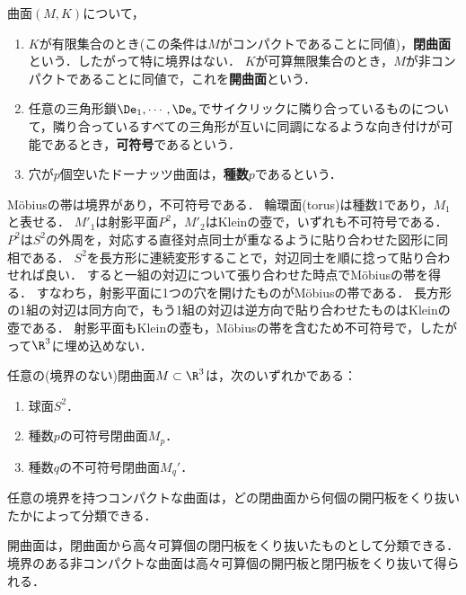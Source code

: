 \documentclass[uplatex,dvipdfmx]{jsreport}
\begin{document}
\begin{definition}[曲面の位相不変量]
    曲面$(M,K)$について，
    \begin{enumerate}
        \item $K$が有限集合のとき(この条件は$M$がコンパクトであることに同値)，\textbf{閉曲面}という．したがって特に境界はない．
        $K$が可算無限集合のとき，$M$が非コンパクトであることに同値で，これを\textbf{開曲面}という．
        \item 任意の三角形鎖$\De_1,\cdots,\De_s$でサイクリックに隣り合っているものについて，隣り合っているすべての三角形が互いに同調になるような向き付けが可能であるとき，\textbf{可符号}であるという．
        \item 穴が$p$個空いたドーナッツ曲面は，\textbf{種数$p$}であるという．
    \end{enumerate}
\end{definition}
\begin{example}[射影平面]
    Möbiusの帯は境界があり，不可符号である．
    輪環面(torus)は種数1であり，$M_1$と表せる．
    $M'_1$は射影平面$P^2$，$M'_2$はKleinの壺で，いずれも不可符号である．
    $P^2$は$S^2$の外周を，対応する直径対点同士が重なるように貼り合わせた図形に同相である．
    $S^2$を長方形に連続変形することで，対辺同士を順に捻って貼り合わせれば良い．
    すると一組の対辺について張り合わせた時点でMöbiusの帯を得る．
    すなわち，射影平面に1つの穴を開けたものがMöbiusの帯である．
    長方形の1組の対辺は同方向で，もう1組の対辺は逆方向で貼り合わせたものはKleinの壺である．
    射影平面もKleinの壺も，Möbiusの帯を含むため不可符号で，したがって$\R^3$に埋め込めない．
\end{example}

\begin{theorem}
    任意の(境界のない)閉曲面$M\subset\R^3$は，次のいずれかである：
    \begin{enumerate}
        \item 球面$S^2$．
        \item 種数$p$の可符号閉曲面$M_p$．
        \item 種数$q$の不可符号閉曲面$M_q'$．
    \end{enumerate}
\end{theorem}

\begin{corollary}
    任意の境界を持つコンパクトな曲面は，どの閉曲面から何個の開円板をくり抜いたかによって分類できる．
\end{corollary}

\begin{remarks}
    開曲面は，閉曲面から高々可算個の閉円板をくり抜いたものとして分類できる．
    境界のある非コンパクトな曲面は高々可算個の開円板と閉円板をくり抜いて得られる．
\end{remarks}
\end{document}
